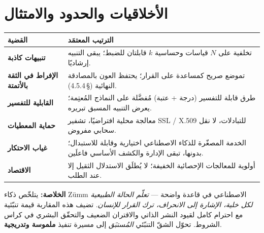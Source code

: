 \section{الأخلاقيات والحدود والامتثال}
\begin{xltabular}{\textwidth}{>{\bfseries}p{4.4cm} X}
\toprule
\textbf{القضية} & \textbf{الترتيب المعتمَد} \\
\midrule
\endhead
تنبيهات كاذبة & تخلفية على $N$ قياسات وحساسية $k$ قابلتان للضبط؛ يبقى التنبيه إرشاديًا. \\
الإفراط في الثقة بالأتمتة & تموضع صريح كمساعدة على القرار؛ يحتفظ العون بالمصادقة النهائية (§\,4.5.4). \\
القابلية للتفسير & طرق قابلة للتفسير (درجة + عتبة) مُفضَّلة على النماذج المُعتِمة؛ يعرض التنبيه المسبق تبريره. \\
حماية المعطيات & معالجة محلية افتراضيًا، تشفير SSL / X.509 للتبادلات، لا نقل سحابي مفروض. \\
غياب الاحتكار & الخدمة المصغّرة للذكاء الاصطناعي اختيارية وقابلة للاستبدال؛ بدونها، تبقى الإدارة والكشف الأساسي فاعلَين. \\
الاقتصاد & أولوية للمعالجات الإحصائية الخفيفة؛ لا يُطلَق الاستدلال الثقيل إلا عند الطلب. \\
\bottomrule
\end{xltabular}

\begin{encadre}
\textbf{الخلاصة:} يتلخّص ذكاء Zümm الاصطناعي في قاعدة واضحة --- \emph{تعلّم
الحالة الطبيعية لكل خلية، الإشارة إلى الانحراف، ترك القرار للإنسان}. تضيف هذه
المقاربة قيمة تنبّئية مع احترام كامل لقيود النشر الذاتي والاقتران الضعيف والتحقّق
البشري في كراس الشروط. تحوّل الشقّ التنبّئي \emph{المُستبَق} إلى مسيرة تنفيذ
\textbf{ملموسة وتدريجية}.
\end{encadre}
